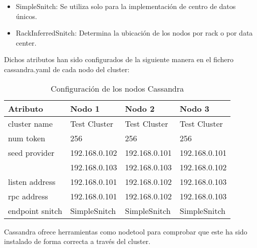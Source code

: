 \begin{itemize}
	\item SimpleSnitch: Se utiliza solo para la implementación de centro de datos únicos.
	\item RackInferredSnitch: Determina la ubicación de los nodos por rack o por data center.
\end{itemize}
	 
Dichos atributos han sido configurados de la siguiente manera en el fichero cassandra.yaml de cada nodo del cluster: 

\begin{table}[h!]
	\centering
	\begin{tabular}{|l||l|l|l|}
		
		\hline
		
		Atributo & Nodo 1 & Nodo 2 & Nodo 3 \\
		
		\hline
		\hline
		
		cluster name & Test Cluster & Test Cluster & Test Cluster \\
		
		\hline
		
		num token & 256 & 256 & 256 \\
		
		\hline
		
		seed provider & 192.168.0.102 & 192.168.0.101 & 192.168.0.101 \\ 
		              & 192.168.0.103 & 192.168.0.103 & 192.168.0.102 \\ 
		
		\hline
		
		listen address & 192.168.0.101 & 192.168.0.102 & 192.168.0.103 \\
		
		\hline
		
		rpc address & 192.168.0.101 & 192.168.0.102 & 192.168.0.103 \\
		
		\hline
		
		endpoint snitch & SimpleSnitch & SimpleSnitch & SimpleSnitch \\
		
		\hline
		
	\end{tabular}
	\caption{Configuración de los nodos Cassandra}
	\label{configuracion-nodos-cassandra}
\end{table}

Cassandra ofrece herramientas como nodetool para comprobar que este ha sido instalado de forma correcta a través del cluster.

